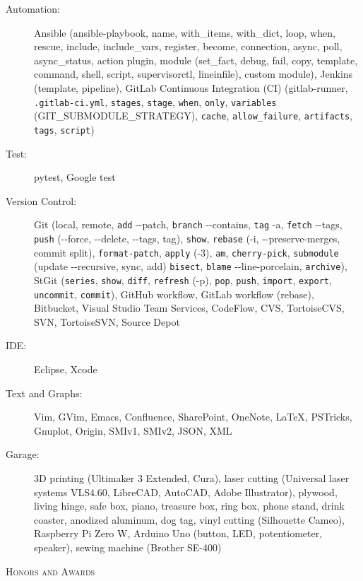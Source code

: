 \documentclass[letterpaper,11pt]{article}
\newcommand{\resheading}[1]{{\noindent\large \colorbox{mygrey}{
\begin{minipage}{1.0\textwidth}{\textsc{#1 \vphantom{p\^{E}}}}\end{minipage}}}}
\begin{document}
\begin{description}
\item[Automation:] Ansible (ansible-playbook, name, with\_items, with\_dict, loop, when, rescue, include, include\_vars, register, become, connection,
async, poll, async\_status, action plugin,
module (set\_fact, debug, fail, copy, template, command, shell, script, supervisorctl, lineinfile), custom module),
Jenkins (template, pipeline), GitLab Continuous Integration (CI) (gitlab-runner, {\tt .gitlab-ci.yml}, {\tt stages}, {\tt stage},
{\tt when}, {\tt only}, {\tt variables} (GIT\_SUBMODULE\_STRATEGY), {\tt cache}, {\tt allow\_failure}, {\tt artifacts}, {\tt tags}, {\tt script})

\item[Test:] pytest, Google test

\item[Version Control:] Git (local, remote, {\tt add} -{}-patch, {\tt branch} -{}-contains, {\tt tag} -a,
{\tt fetch} -{}-tags, {\tt push} (-{}-force, -{}-delete, -{}-tags, tag), {\tt show}, {\tt rebase} (-i, -{}-preserve-merges, commit split),
{\tt format-patch}, {\tt apply} (-3), {\tt am}, {\tt cherry-pick}, {\tt submodule} (update -{}-recursive, sync, add)
{\tt bisect}, {\tt blame} -{}-line-porcelain, {\tt archive}),
%
StGit ({\tt series}, {\tt show}, {\tt diff}, {\tt refresh} (-p), {\tt pop}, {\tt push},
{\tt import}, {\tt export}, {\tt uncommit}, {\tt commit}),
%
GitHub workflow, GitLab workflow (rebase), Bitbucket, Visual Studio Team Services,
CodeFlow, CVS, TortoiseCVS, SVN, TortoiseSVN, Source Depot

\item[IDE:] Eclipse, Xcode

\item[Text and Graphs:] Vim, GVim, Emacs, Confluence, SharePoint, OneNote, \LaTeX, PSTricks, Gnuplot, Origin, SMIv1, SMIv2, JSON, XML

\item[Garage:] 3D printing (Ultimaker 3 Extended, Cura), laser cutting (Universal laser systems VLS4.60, LibreCAD, AutoCAD, Adobe Illustrator),
plywood, living hinge, safe box, piano, treasure box, ring box, phone stand, drink coaster, anodized aluminum, dog tag,
vinyl cutting (Silhouette Cameo), Raspberry Pi Zero W, Arduino Uno (button, LED, potentiometer, speaker), sewing machine (Brother SE-400)

\end{description}




\resheading{Honors and Awards}%
\end{document}
